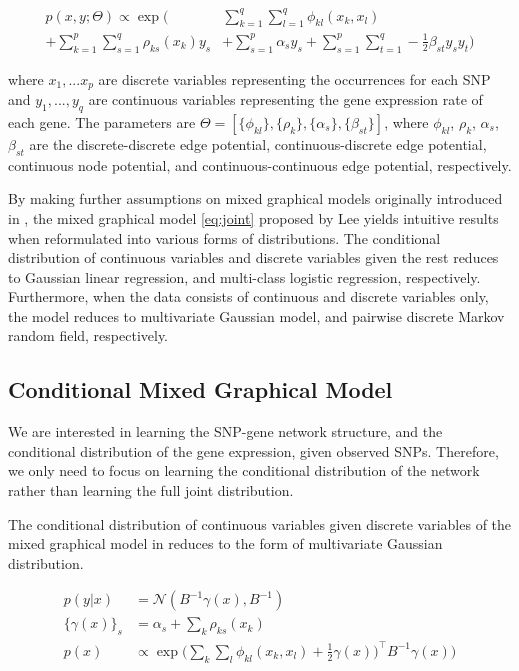 \documentclass{article}
\begin{document}
\begin{align}
p(x, y ; \Theta) \propto \exp \Big( &\sum_{k=1}^{q} \sum_{l=1}^{q} \phi_{kl} (x_k, x_l) \nonumber \\
+ \sum_{k=1}^{p} \sum_{s=1}^{q} \rho_{ks}(x_k) y_s  &+ \sum_{s=1}^{p} \alpha_s y_s + \sum_{s=1}^{p} \sum_{t=1}^{q} -\frac{1}{2} \beta_{st} y_s y_t \Big) \label{eq:joint}
\end{align} 

where $x_1, ... x_p$ are discrete variables representing the occurrences for each SNP and $y_1, ..., y_q$ are continuous variables representing the gene expression rate of each gene. 
The parameters are $\Theta = [\{\phi_{kl}\}, \{\rho_{k}\}, \{\alpha_{s}\}, \{\beta_{st}\}]$, where $\phi_{kl}$, $\rho_{k}$, $\alpha_{s}$, $\beta_{st}$ are the discrete-discrete edge potential, continuous-discrete edge potential, continuous node potential, and continuous-continuous edge potential, respectively.

By making further assumptions on mixed graphical models originally introduced in \cite{lauritzen1989graphical}, the mixed graphical model \ref{eq:joint} proposed by Lee \cite{lee2013structure} yields intuitive results when reformulated into various forms of distributions. The conditional distribution of continuous variables and discrete variables given the rest reduces to Gaussian linear regression, and multi-class logistic regression, respectively. Furthermore, when the data consists of continuous and discrete variables only, the model reduces to multivariate Gaussian model, and pairwise discrete Markov random field, respectively. 

\subsection{Conditional Mixed Graphical Model}
We are interested in learning the SNP-gene network structure, and the conditional distribution of the gene expression, given observed SNPs.
Therefore, we only need to focus on learning the conditional distribution of the network rather than learning the full joint distribution. 

The conditional distribution of continuous variables given discrete variables of the mixed graphical model in \cite{lee2013structure} reduces to the form of multivariate Gaussian distribution.

\begin{align}
p(y|x) &= \mathcal{N}(B^{-1}\gamma(x), B^{-1}) \label{eq:cond_prob}\\
\{\gamma(x)\}_s &= \alpha_s + \sum_{k} \rho_{ks}(x_k) \\
p(x) &\propto \exp \Big( \sum_{k} \sum_{l} \phi_{kl}(x_k, x_l) + \frac{1}{2} \gamma(x))^\intercal B^{-1} \gamma(x) \Big)
\end{align}
\end{document}
